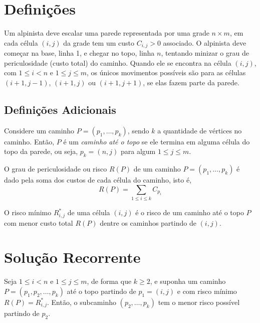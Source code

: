 \section{Definições}

Um alpinista deve escalar uma parede representada por uma grade $n \times m$, em cada célula $(i, j)$ da grade tem um custo $C_{i, j} > 0$ associado. O alpinista deve começar na base, linha 1, e chegar no topo, linha $n$, tentando minizar o grau de periculosidade (custo total) do caminho. Quando ele se encontra na célula $(i, j)$, com $1 \leq i < n$ e $1 \leq j \leq m$, os únicos movimentos possíveis são para as células $(i+1, j-1)$, $(i+1, j)$ ou $(i+1, j+1)$, se elas fazem parte da parede.

\subsection{Definições Adicionais}

\begin{definition}
    Considere um caminho $P = \left(p_1, \ldots, p_k\right)$, sendo $k$ a quantidade de vértices no caminho. Então, $P$ é um \textit{caminho até o topo} se ele termina em alguma célula do topo da parede, ou seja, $p_k = (n, j)$ para algum $1 \leq j \leq m$.
\end{definition}

\begin{definition}[Risco]
    O grau de periculosidade ou risco $R(P)$ de um caminho $P = \left(p_1, \ldots, p_k\right)$ é dado pela soma dos custos de cada célula do caminho, isto é,
    \[
        R(P) = \sum_{1 \leq i \leq k} C_{p_i}
    \]
\end{definition}

\begin{definition}
    O risco mínimo $R^*_{i, j}$ de uma célula $(i, j)$ é o risco de um caminho até o topo $P$ com menor custo total $R(P)$ dentre os caminhos partindo de $(i, j)$.
\end{definition}

\section{Solução Recorrente}

\begin{theorem}
    Seja $1 \leq i < n$ e $1 \leq j \leq m$, de forma que $k \geq 2$, e suponha um caminho $P = \left(p_1, p_2, \ldots, p_k\right)$ até o topo partindo de $p_1 = (i, j)$ e com risco mínimo $R(P) = R^*_{i, j}$. Então, o subcaminho $\left(p_2, \ldots, p_k\right)$ tem o menor risco possível partindo de $p_2$.
\end{theorem}

